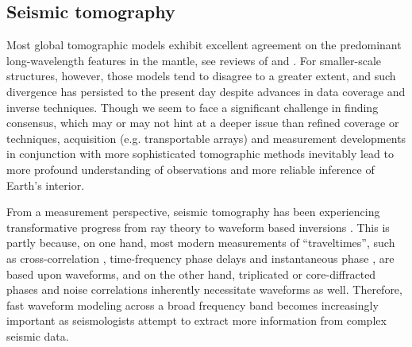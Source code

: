 \documentclass[extra]{gji}
\begin{document}
\subsection{Seismic tomography}
\label{sec:tomography}
Most global tomographic models exhibit excellent agreement on the 
predominant long-wavelength features in the mantle,
see reviews of \cite{becker2002comparison} and \cite{auer2014savani}. 
For smaller-scale structures, however, those models tend to disagree to a 
greater extent, and such divergence has persisted to the present day
despite advances in data coverage and inverse techniques. 
Though we seem to face a significant challenge in finding consensus, which 
may or may not hint at a deeper issue than refined coverage or techniques,
acquisition (e.g. transportable arrays) and measurement developments 
in conjunction with more sophisticated tomographic methods
inevitably lead to more profound understanding of observations
and more reliable inference of Earth's interior.

From a measurement perspective, 
seismic tomography has been experiencing transformative progress
from ray theory \cite[]{rawlinson2010seismic} to waveform based
inversions \cite[]{tape2009adjoint, fichtner2008theoretical}. 
This is partly because, on one hand,
most modern measurements of ``traveltimes'', 
such as cross-correlation \cite[Chap 7,][]{nolet2008breviary}, 
time-frequency phase delays \cite[]{fichtner2008theoretical, 
kristekova2009time} and instantaneous phase \cite[]{bozdaug2011misfit}, 
are based upon waveforms,
and on the other hand, triplicated \cite[]{stahler2012triplicated} or 
core-diffracted phases \cite[]{bharadwaj2013enhancing, hosseini2015multifrequency} 
and noise correlations \cite[]{basini2013influence} inherently 
necessitate waveforms as well.
Therefore, fast waveform modeling across a broad frequency band
becomes increasingly important as seismologists attempt to extract  
more information from complex seismic data. 
\end{document}
